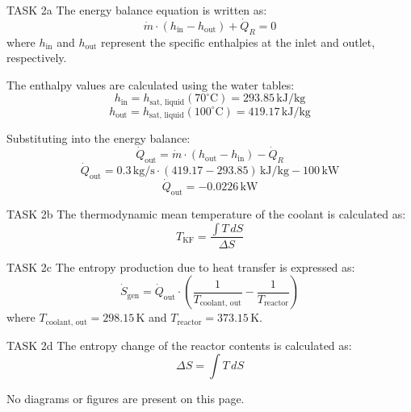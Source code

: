 TASK 2a  
The energy balance equation is written as:  
\[
\dot{m} \cdot (h_{\text{in}} - h_{\text{out}}) + \dot{Q}_R = 0
\]  
where \( h_{\text{in}} \) and \( h_{\text{out}} \) represent the specific enthalpies at the inlet and outlet, respectively.  

The enthalpy values are calculated using the water tables:  
\[
h_{\text{in}} = h_{\text{sat, liquid}}(70^\circ\text{C}) = 293.85 \, \text{kJ/kg}
\]  
\[
h_{\text{out}} = h_{\text{sat, liquid}}(100^\circ\text{C}) = 419.17 \, \text{kJ/kg}
\]  

Substituting into the energy balance:  
\[
\dot{Q}_{\text{out}} = \dot{m} \cdot (h_{\text{out}} - h_{\text{in}}) - \dot{Q}_R
\]  
\[
\dot{Q}_{\text{out}} = 0.3 \, \text{kg/s} \cdot (419.17 - 293.85) \, \text{kJ/kg} - 100 \, \text{kW}
\]  
\[
\dot{Q}_{\text{out}} = -0.0226 \, \text{kW}
\]  

TASK 2b  
The thermodynamic mean temperature of the coolant is calculated as:  
\[
T_{\text{KF}} = \frac{\int T \, dS}{\Delta S}
\]  

TASK 2c  
The entropy production due to heat transfer is expressed as:  
\[
\dot{S}_{\text{gen}} = \dot{Q}_{\text{out}} \cdot \left( \frac{1}{T_{\text{coolant, out}}} - \frac{1}{T_{\text{reactor}}} \right)
\]  
where \( T_{\text{coolant, out}} = 298.15 \, \text{K} \) and \( T_{\text{reactor}} = 373.15 \, \text{K} \).  

TASK 2d  
The entropy change of the reactor contents is calculated as:  
\[
\Delta S = \int T \, dS
\]  

No diagrams or figures are present on this page.